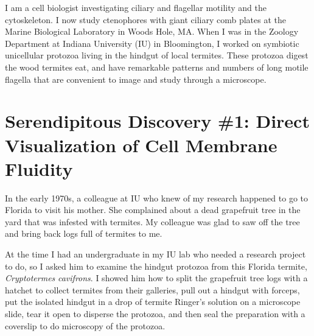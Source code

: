 \documentclass[authordate, anecdote]{jote-new-article}
\author[1]{\mbox{Sidney L. Tamm\orcid{0000-0002-4756-778X}}}
\affil[1]{Marine Biological Laboratory (MBL), Woods Hole, Massachusetts, United States}
\begin{document}
\begin{frontmatter}
  \maketitle
  \begin{abstract}
    \printabstracttext
  \end{abstract}
\end{frontmatter}


	I am a cell biologist investigating ciliary and flagellar motility and the cytoskeleton. I now study ctenophores with giant ciliary comb plates at the Marine Biological Laboratory in Woods Hole, MA. When I was in the Zoology Department at Indiana University (IU) in Bloomington, I worked on symbiotic unicellular protozoa living in the hindgut of local termites. These protozoa digest the wood termites eat, and have remarkable patterns and numbers of long motile flagella that are convenient to image and study through a microscope. 


	\section{Serendipitous Discovery \#1: Direct Visualization of Cell Membrane Fluidity}







	In the early 1970s, a colleague at IU who knew of my research happened to go to Florida to visit his mother. She complained about a dead grapefruit tree in the yard that was infested with termites. My colleague was glad to saw off the tree and bring back logs full of termites to me.







	At the time I had an undergraduate in my IU lab who needed a research project to do, so I asked him to examine the hindgut protozoa from this Florida termite, \emph{Cryptotermes}\emph{ }\emph{cavifrons}. I showed him how to split the grapefruit tree logs with a hatchet to collect termites from their galleries, pull out a hindgut with forceps, put the isolated hindgut in a drop of termite Ringer's solution on a microscope slide, tear it open to disperse the protozoa, and then seal the preparation with a coverslip to do microscopy of the protozoa.
\end{document}

